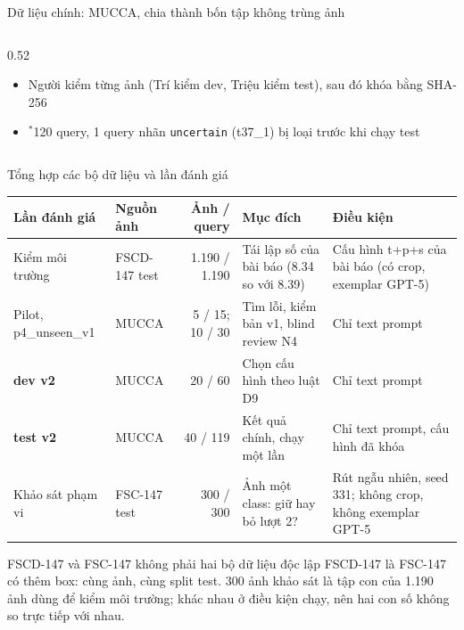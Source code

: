 \documentclass[aspectratio=169,10pt]{beamer}
\gdef\currentsource{}
\newcommand{\source}[1]{\gdef\currentsource{#1}}
\begin{document}
\begin{frame}{Dữ liệu chính: MUCCA, chia thành bốn tập không trùng ảnh}
\begin{columns}[T]
\begin{column}{0.52\textwidth}
\begin{itemize}
\item Người kiểm từng ảnh (Trí kiểm dev, Triệu kiểm test), sau đó khóa bằng SHA-256
\item $^{*}$120 query, 1 query nhãn \texttt{uncertain} (t37\_1) bị loại trước khi chạy test
\end{itemize}
\end{column}
\end{columns}
\end{frame}

\begin{frame}{Tổng hợp các bộ dữ liệu và lần đánh giá}
\source{\texttt{BENCHMARK\_FSCD147.md}; \texttt{KHAI\_BAO\_TRUOC\_FSC147\_20261120.md}; \texttt{dev\_test\_v2/selection\_meta.json}}
\scriptsize\centering
\renewcommand{\arraystretch}{1.15}
\begin{tabularx}{\textwidth}{@{}l l r >{\raggedright\arraybackslash}X >{\raggedright\arraybackslash}p{}@{}}
\toprule
Lần đánh giá & Nguồn ảnh & Ảnh / query & Mục đích & Điều kiện\\
\midrule
Kiểm môi trường & FSCD-147 test & 1.190 / 1.190 & Tái lập số của bài báo (8.34 so với 8.39) & Cấu hình t+p+s của bài báo (có crop, exemplar GPT-5)\\
Pilot, p4\_unseen\_v1 & MUCCA & 5 / 15; 10 / 30 & Tìm lỗi, kiểm bản v1, blind review N4 & Chỉ text prompt\\
\textbf{dev v2} & MUCCA & 20 / 60 & Chọn cấu hình theo luật D9 & Chỉ text prompt\\
\textbf{test v2} & MUCCA & 40 / 119 & Kết quả chính, chạy một lần & Chỉ text prompt, cấu hình đã khóa\\
Khảo sát phạm vi & FSC-147 test & 300 / 300 & Ảnh một class: giữ hay bỏ lượt 2? & Rút ngẫu nhiên, seed 331; không crop, không exemplar GPT-5\\
\bottomrule
\end{tabularx}
\vspace{2mm}
\begin{alertblock}{FSCD-147 và FSC-147 không phải hai bộ dữ liệu độc lập}
\small FSCD-147 là FSC-147 có thêm box: cùng ảnh, cùng split test. 300 ảnh khảo sát là tập con của 1.190 ảnh dùng để kiểm môi trường; khác nhau ở điều kiện chạy, nên hai con số không so trực tiếp với nhau.
\end{alertblock}
\end{frame}
\end{document}
